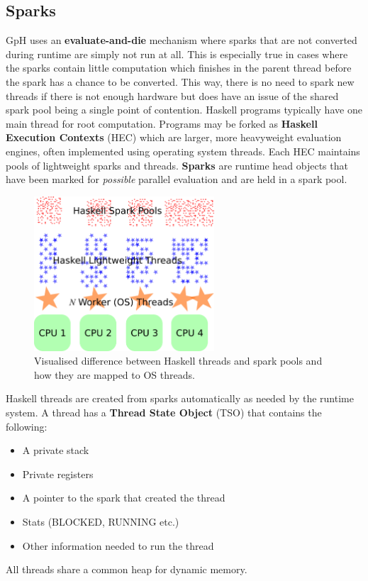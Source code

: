 \documentclass[CS4204-Notes.tex]{subfiles}
\begin{document}
\subsection{Sparks}
GpH uses an \textbf{evaluate-and-die} mechanism where sparks that are not converted during runtime are simply not run at all. This is especially true in cases where the sparks contain little computation which finishes in the parent thread before the spark has a chance to be converted. This way, there is no need to spark new threads if there is not enough hardware but does have an issue of the shared spark pool being a single point of contention. 
\n
Haskell programs typically have one main thread for root computation. Programs may be forked as \textbf{Haskell Execution Contexts} (HEC) which are larger, more heavyweight evaluation engines, often implemented using operating system threads. Each HEC maintains pools of lightweight sparks and threads. \textbf{Sparks} are runtime head objects that have been marked for \textit{possible} parallel evaluation and are held in a spark pool. 
\begin{figure}[H]
\centering
\includegraphics[width=0.6\textwidth, keepaspectratio]{imgs/haskell-threads.png}
\caption{Visualised difference between Haskell threads and spark pools and how they are mapped to OS threads.}
\end{figure}
\noindent
Haskell threads are created from sparks automatically as needed by the runtime system. A thread has a \textbf{Thread State Object} (TSO) that contains the following:
\begin{itemize}
\item A private stack
\item Private registers
\item A pointer to the spark that created the thread
\item Stats (BLOCKED, RUNNING etc.)
\item Other information needed to run the thread
\end{itemize}
All threads share a common heap for dynamic memory. 
\end{document}
